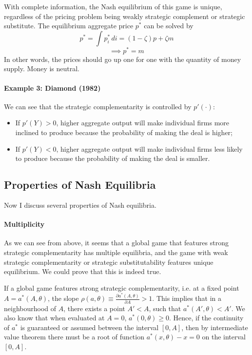 \documentclass[12pt]{article}
\begin{document}
With complete information, the Nash equilibrium of this game is unique, regardless of the pricing problem being weakly strategic complement or strategic substitute. The equilibrium aggregate price $p^*$ can be solved by
\[p^* = \int p_i^* \, di = (1-\zeta) p + \zeta m \]
\begin{equation}
	\implies p^* = m
\end{equation} 
In other words, the prices should go up one for one with the quantity of money supply. Money is neutral.

\paragraph{Example 3: Diamond (1982) \\ [6pt]}

We can see that the strategic complementarity is controlled by $p'(\cdot)$:
\begin{itemize}
	\item If $p'(Y) > 0$, higher aggregate output will make individual firms more inclined to produce because the probability of making the deal is higher;
	\item If $p'(Y) < 0$, higher aggregate output will make individual firms less likely to produce because the probability of making the deal is smaller. 
\end{itemize}


\subsection{Properties of Nash Equilibria}

Now I discuss several properties of Nash equilibria. 

\paragraph{Multiplicity \\ [6pt]}

As we can see from above, it seems that a global game that features strong strategic complementarity has multiple equilibria, and the game with weak strategic complementarity or strategic substitutability features unique equilibrium. We could prove that this is indeed true.

If a global game features strong strategic complementarity, i.e. at a fixed point $A = a^*(A, \theta)$, the slope $\rho(a, \theta) \equiv \frac{\partial a^*(A, \theta)}{\partial A} > 1$. This implies that in a neighbourhood of $A$, there exists a point $A' < A$, such that $a^*(A', \theta) < A'$. We also know that when evaluated at $A = 0$, $a^*(0, \theta) \geq 0$. Hence, if the continuity of $a^*$ is guaranteed or assumed between the interval $[0,A]$, then by intermediate value theorem there must be a root of function $a^*(x, \theta) - x = 0$ on the interval $[0,A]$.
\end{document}
